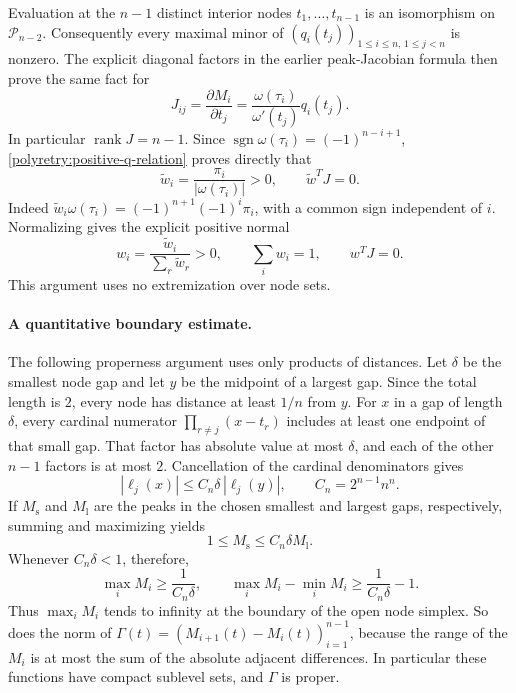 \documentclass[11pt]{article}
\newcommand{\rank}{\operatorname{rank}}
\theoremstyle{remark}\newtheorem{remark}[theorem]{Remark}
\begin{document}
Evaluation at the $n-1$ distinct interior nodes
$t_1,\ldots,t_{n-1}$ is an isomorphism on
$\mathcal P_{n-2}$.  Consequently every maximal minor of
$(q_i(t_j))_{1\le i\le n,\,1\le j<n}$ is nonzero.
The explicit diagonal factors in the earlier peak-Jacobian
formula then prove the same fact for
\begin{equation}\label{polyretry:peak-jacobian}
 J_{ij}=\frac{\partial M_i}{\partial t_j}
       =\frac{\omega(\tau_i)}{\omega'(t_j)}q_i(t_j).
\end{equation}
In particular $\rank J=n-1$.  Since
$\operatorname{sgn}\omega(\tau_i)=(-1)^{n-i+1}$,
\eqref{polyretry:positive-q-relation} proves directly that
\[
 \widetilde w_i=\frac{\pi_i}{|\omega(\tau_i)|}>0,
 \qquad \widetilde w^TJ=0.
\]
Indeed
$\widetilde w_i\omega(\tau_i)=(-1)^{n+1}(-1)^i\pi_i$,
with a common sign independent of $i$.  Normalizing gives
the explicit positive normal
\begin{equation}\label{polyretry:positive-normal}
 w_i=\frac{\widetilde w_i}{\sum_r\widetilde w_r}>0,
 \qquad\sum_iw_i=1,\qquad w^TJ=0.
\end{equation}
This argument uses no extremization over node sets.

\paragraph{A quantitative boundary estimate.}
The following properness argument uses only products of
distances.  Let $\delta$ be the smallest node gap and let $y$
be the midpoint of a largest gap.  Since the total length is
$2$, every node has distance at least $1/n$ from $y$.
For $x$ in a gap of length $\delta$, every cardinal numerator
$\prod_{r\ne j}(x-t_r)$ includes at least one endpoint of
that small gap.  That factor has absolute value at most
$\delta$, and each of the other $n-1$ factors is at most $2$.
Cancellation of the cardinal denominators gives
\[
 |\ell_j(x)|\le C_n\delta\,|\ell_j(y)|,
 \qquad C_n=2^{n-1}n^n.
\]
If $M_{\mathrm{s}}$ and $M_{\mathrm{l}}$ are the peaks in
the chosen smallest and largest gaps, respectively, summing
and maximizing yields
\[
 1\le M_{\mathrm{s}}\le C_n\delta M_{\mathrm{l}}.
\]
Whenever $C_n\delta<1$, therefore,
\begin{equation}\label{polyretry:properness}
 \max_i M_i\ge\frac1{C_n\delta},\qquad
 \max_i M_i-\min_i M_i\ge\frac1{C_n\delta}-1.
\end{equation}
Thus $\max_i M_i$ tends to infinity at the boundary of the
open node simplex.  So does the norm of
$\Gamma(t)=(M_{i+1}(t)-M_i(t))_{i=1}^{n-1}$, because the
range of the $M_i$ is at most the sum of the absolute adjacent
differences.  In particular these functions have compact
sublevel sets, and $\Gamma$ is proper.
\end{document}
